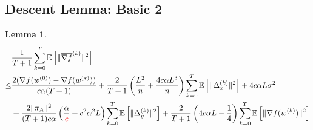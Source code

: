 \documentclass{article}
\newtheorem{lemma}[thm]{Lemma}
\newcommand{\EE}[1]{\mathbb{E}\left[#1\right]}
\newcommand{\norm}[1]{\| #1 \|}
\begin{document}
\subsection{Descent Lemma: Basic 2}
\begin{lemma}\label{Descent Lemma: Basic 2}
  \begin{align*}
    &\frac{1}{T+1}\sum_{k=0}^T\EE{\norm{\overline{\nabla f}^{(k)}}^2}\\ \leq& \frac{2(\nabla f(w^{(0)})-\nabla f(w^{(*)}))}{c\alpha(T+1)}+\frac{2}{T+1}\left(\frac{L^2}{n}+\frac{4c\alpha L^3}{n}\right)\sum_{k=0}^T\EE{\norm{\Delta_x^{(k)}}^2}+4c\alpha L\sigma^2\\&+\frac{2\norm{\pi_A}^2}{(T+1)c\alpha}\left(\frac{\alpha}{\textcolor{red}{c}}+c^2\alpha^2L\right)\sum_{k=0}^T\EE{\norm{\Delta_{y}^{(k)}}^2}+\frac{2}{T+1}\left(4c\alpha L-\frac{1}{4}\right)\sum_{k=0}^T\EE{\norm{\nabla f(w^{(k)})}^2}
  \end{align*}
\end{lemma}
\end{document}
